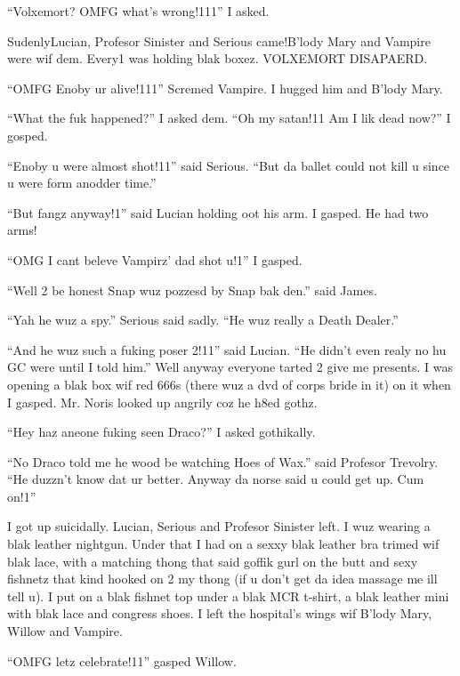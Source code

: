 \enquote{Volxemort? OMFG what's wrong!111} I asked.

Sudenly\dotfill Lucian, Profesor Sinister and Serious came!\newline B'lody Mary and Vampire were wif dem. Every1 was holding blak boxez. VOLXEMORT DISAPAERD\@.

\enquote{OMFG Enoby ur alive!111} Scremed Vampire. I hugged him and B'lody Mary.

\enquote{What the fuk happened?} I asked dem. \enquote{Oh my satan!11 Am I lik dead now?} I gosped.

\enquote{Enoby u were almost shot!11} said Serious. \enquote{But da ballet could not kill u since u were form anodder time.}

\begin{sloppypar}
    \enquote{But fangz anyway!1} said Lucian holding oot his arm. I gasped. He had two arms!
\end{sloppypar}

\enquote{OMG I cant beleve Vampirz' dad shot u!1} I gasped.

\enquote{Well 2 be honest Snap wuz pozzesd by Snap bak den.} said James.

\enquote{Yah he wuz a spy.} Serious said sadly. \enquote{He wuz really a Death Dealer.}

\enquote{And he wuz such a fuking poser 2!11} said Lucian. \enquote{He didn't even realy no hu GC were until I told him.} Well anyway everyone tarted 2 give me presents. I was opening a blak box wif red 666s (there wuz a dvd of corps bride in it) on it when I gasped. Mr. Noris looked up angrily coz he h8ed gothz.

\enquote{Hey haz aneone fuking seen Draco?} I asked gothikally.

\enquote{No Draco told me he wood be watching Hoes of Wax.} said Profesor Trevolry. \enquote{He duzzn't know dat ur better. Anyway da norse said u could get up. Cum on!1}

I got up suicidally. Lucian, Serious and Profesor Sinister left. I wuz wearing a blak leather nightgun. Under that I had on a sexxy blak leather bra trimed wif blak lace, with a matching thong that said goffik gurl on the butt and sexy fishnetz that kind hooked on 2 my thong (if u don't get da idea massage me ill tell u). I put on a blak fishnet top under a blak MCR t-shirt, a blak leather mini with blak lace and congress shoes. I left the hospital's wings wif B'lody Mary, Willow and Vampire.

\enquote{OMFG letz celebrate!11} gasped Willow.

